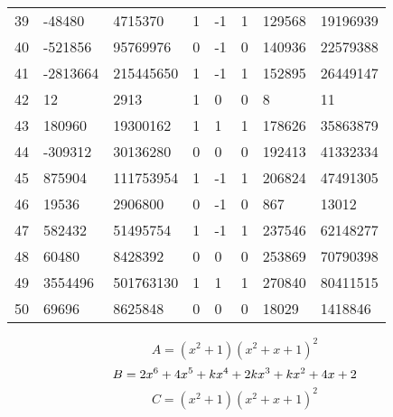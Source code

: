 \documentclass{amsart}
\begin{document}
\begin{longtable}{|l|l|l|lllll|}
39&-48480&4715370&1&-1&1&129568&19196939\\
40&-521856&95769976&0&-1&0&140936&22579388\\
41&-2813664&215445650&1&-1&1&152895&26449147\\
42&12&2913&1&0&0&8&11\\
43&180960&19300162&1&1&1&178626&35863879\\
44&-309312&30136280&0&0&0&192413&41332334\\
45&875904&111753954&1&-1&1&206824&47491305\\
46&19536&2906800&0&-1&0&867&13012\\
47&582432&51495754&1&-1&1&237546&62148277\\
48&60480&8428392&0&0&0&253869&70790398\\
49&3554496&501763130&1&1&1&270840&80411515\\
50&69696&8625848&0&0&0&18029&1418846\\
\hline
\end{longtable}
$$A=(x^2
 + 1)(x^2
 + x
 + 1)^{2}$$
$$B=2\*x^6
 + 4\*x^5
 + k\*x^4
 + 2\*k\*x^3
 + k\*x^2
 + 4\*x
 + 2$$
$$C=(x^2
 + 1)(x^2
 + x
 + 1)^{2}$$
\end{document}
